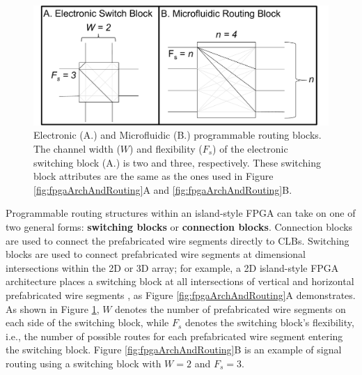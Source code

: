 \begin{figure}[h]
     \begin{minipage}[t]{0.99\linewidth}\centering
      \includegraphics[width=15cm]{fig8.pdf}
      \medskip
     \end{minipage}\hfill
     \caption[Electronic and Microfluidic programmable routing blocks]{Electronic (A.) and Microfluidic (B.) programmable routing blocks. The channel width ($W$) and flexibility ($F_s$) of the electronic switching block (A.) is two and three, respectively. These switching block attributes are the same as the ones used in Figure \ref{fig:fpgaArchAndRouting}A and \ref{fig:fpgaArchAndRouting}B.}
	\label{fig:switchBlocks}
\end{figure}

Programmable routing structures within an island-style FPGA can take on one of two general forms: \textbf{switching blocks} or \textbf{connection blocks}. Connection blocks are used to connect the prefabricated wire segments directly to CLBs. Switching blocks are used to connect prefabricated wire segments at dimensional intersections within the 2D or 3D array; for example, a 2D island-style FPGA architecture places a switching block at all intersections of vertical and horizontal prefabricated wire segments \cite{schmit2002fpga}, as Figure \ref{fig:fpgaArchAndRouting}A demonstrates. As shown in Figure \ref{fig:switchBlocks}, $W$ denotes the number of prefabricated wire segments on each side of the switching block, while $F_s$ denotes the switching block's flexibility, i.e., the number of possible routes for each prefabricated wire segment entering the switching block. Figure \ref{fig:fpgaArchAndRouting}B is an example of signal routing using a switching block with $W=2$ and $F_s=3$. 


